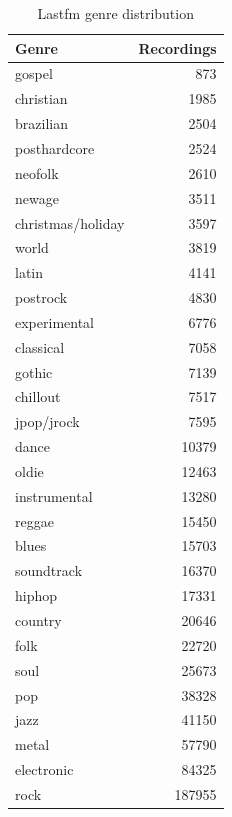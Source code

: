 \begin{table}[!ht]
    \centering
    \begin{tabular}{l r} 
        \hline
        Genre & Recordings \\ [0.5ex] 
        \hline
        gospel & 873  \\
        christian & 1985  \\
        brazilian & 2504  \\
        posthardcore & 2524  \\
        neofolk & 2610  \\
        newage & 3511  \\
        christmas/holiday & 3597  \\
        world & 3819  \\
        latin & 4141  \\
        postrock & 4830  \\
        experimental & 6776  \\
        classical & 7058  \\
        gothic & 7139  \\
        chillout & 7517  \\
        jpop/jrock & 7595  \\
        dance & 10379  \\
        oldie & 12463  \\
        instrumental & 13280  \\
        reggae & 15450  \\
        blues & 15703  \\
        soundtrack & 16370  \\
        hiphop & 17331  \\
        country & 20646  \\
        folk & 22720  \\
        soul & 25673  \\
        pop & 38328  \\
        jazz & 41150  \\
        metal & 57790  \\
        electronic & 84325  \\
        rock & 187955  \\
        \hline
    \end{tabular}
    \caption{Lastfm genre distribution}
    \label{table:lastfmdist}
\end{table}

